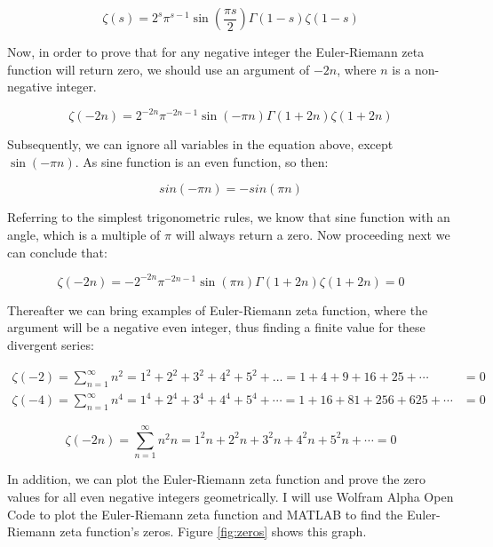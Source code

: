 \documentclass[a4paper]{article}
\begin{document}
\begin{equation}
  \zeta(s)=2^s\pi^{s-1}\sin(\frac{\pi s}{2})\Gamma(1-s)\zeta(1-s)
  \end{equation}

Now, in order to prove that for any negative integer the Euler-Riemann zeta
function will return zero, we should use an argument of $-2n$, where $n$ is a
non-negative integer. 

\begin{equation}
  \zeta(-2n)=2^{-2n}\pi^{-2n-1}\sin(-\pi n)\Gamma(1+2n)\zeta(1+2n)
  \end{equation}

Subsequently, we can ignore all variables in the equation above, except
$\sin(-\pi n)$. As sine function is an even function, so then:

\begin{equation}
  sin(-\pi n)=-sin(\pi n)
  \end{equation}

Referring to the simplest trigonometric rules, we know that sine function with
an angle, which is a multiple of $\pi$ will always return a zero. Now proceeding
next we can conclude that: 

\begin{equation*}
  \zeta(-2n)=-2^{-2n}\pi^{-2n-1}\sin(\pi n)\Gamma(1+2n)\zeta(1+2n)=0
  \end{equation*}

Thereafter we can bring examples of Euler-Riemann zeta function, where the
argument will be a negative even integer, thus finding a finite value for these
divergent series: 

\begin{align*}
  \zeta(-2)=\sum_{n=1}^{\infty} n^2=1^2+2^2+3^2+4^2+5^2+...=1+4+9+16+25+\cdots&=0\\
  \zeta(-4)=\sum_{n=1}^{\infty} n^4=1^4+2^4+3^4+4^4+5^4+\cdots=1+16+81+256+625+\cdots&=0
\end{align*}

\begin{equation}
\zeta(-2n)=\sum_{n=1}^{\infty} n^2n=1^2n+2^2n+3^2n+4^2n+5^2n+\cdots=0
  \end{equation}

In addition, we can plot the Euler-Riemann zeta function and prove the zero
values for all even negative integers geometrically. I will use Wolfram Alpha
Open Code to plot the Euler-Riemann zeta function and MATLAB to find the
Euler-Riemann zeta function's zeros. Figure \ref{fig:zeros} shows this graph. 
\end{document}
